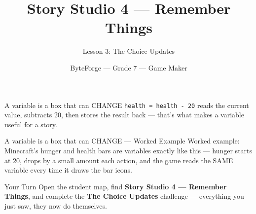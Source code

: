 \documentclass[aspectratio=169]{beamer}
\title{Story Studio 4 — Remember Things}
\subtitle{Lesson 3: The Choice Updates}
\author{ByteForge --- Grade 7 --- Game Maker}
\date{}
\begin{document}
\begin{frame}
    \titlepage
\end{frame}

\begin{frame}{A variable is a box that can CHANGE}
    \Large
    \texttt{health = health - 20} reads the current value, subtracts 20, then stores the result back — that's what makes a variable useful for a story.

    \begin{center}
    \end{center}
\end{frame}

\begin{frame}{A variable is a box that can CHANGE --- Worked Example}
    \Large
    Worked example: Minecraft's hunger and health bars are variables exactly like this — hunger starts at 20, drops by a small amount each action, and the game reads the SAME variable every time it draws the bar icons.
\end{frame}

\begin{frame}{Your Turn}
    \Large
    Open the student map, find \textbf{Story Studio 4 — Remember Things}, and complete
    the \textbf{The Choice Updates} challenge --- everything you just saw, they now do themselves.
\end{frame}
\end{document}
